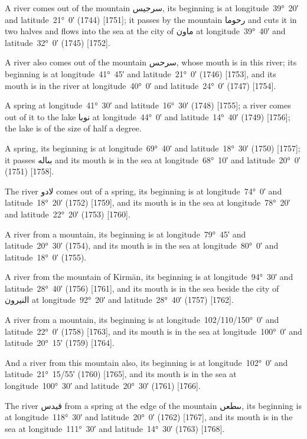 \documentclass[11pt]{article}
\newcommand{\Pg}[1]{\marginpar{\footnotesize #1}}
\begin{document}
A river comes out of the mountain \textarabic{سرجيس}, its beginning is at longitude~39°~20′ and latitude~21°~0′ (1744) [1751]; it passes by the mountain \textarabic{رحوما} and cuts it in two halves and flows into the sea at the city of \textarabic{ماون} at longitude~39°~40′ and latitude~32°~0′ (1745) [1752].

A river also comes out of the mountain \textarabic{سرحس}, whose mouth is in this river; its beginning is at longitude~41°~45′ and latitude~21°~0′ (1746) [1753], and its mouth is in the river at longitude~40°~0′ and latitude~24°~0′ (1747) [1754].

A spring at longitude~41°~30′ and latitude~16°~30′ (1748) [1755]; a river comes out of it to the lake \textarabic{نوبا} at longitude~44°~0′ and latitude~14°~40′ (1749) [1756]; the lake is of the size of half a degree.

A spring, its beginning is at longitude~69°~40′ and latitude~18°~30′ (1750) [1757]; it passes \textarabic{بٮاله} and its mouth is in the sea at longitude~68°~10′ and latitude~20°~0′ (1751) [1758].

The river \textarabic{لادو} comes out of a spring, its beginning is at longitude~74°~0′ and latitude~18°~20′ (1752) [1759], and its mouth is in the sea at longitude~78°~20′ and latitude~22°~20′ (1753) [1760].

A river from a mountain, its beginning is at longitude~79°~45′ and latitude~20°~30′ (1754), and its mouth is in the sea at longitude~80°~0′ and latitude~18°~0′ (1755).

A river from the mountain of Kirmān, its beginning is at longitude~94°~30′ and latitude~28°~40′ (1756) [1761], and its mouth is in the sea beside the city of \textarabic{النيرون} at longitude~92°~20′ and latitude~28°~40′ (1757) [1762].

A river from a mountain, its beginning is at longitude~102/110/150°~0′ and latitude~22°~0′ (1758) [1763], and its mouth is in the sea at longitude~100°~0′ and latitude~20°~15′ (1759) [1764].

And a river from this mountain also, its beginning is at longitude~102°~0′ and latitude~21°~15/55′ (1760) [1765], and its mouth is in the sea at longitude~100°~30′ and latitude~20°~30′ (1761) [1766]\Pg{p. 117}.

The river \textarabic{قيدس} from a spring at the edge of the mountain \textarabic{ٮٮطعں}, its beginning is at longitude~118°~30′ and latitude~20°~0′ (1762) [1767], and its mouth is in the sea at longitude~111°~30′ and latitude~14°~30′ (1763) [1768].
\end{document}
